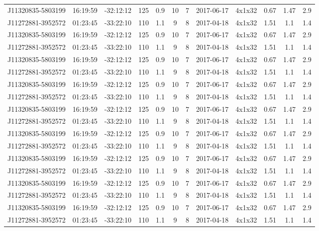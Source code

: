 \documentclass[onecolumn]{aa} %
\begin{document}
{\begin{landscape}
\begin{longtable}{cccccccccccc}
J11320835-5803199 & 16:19:59 & -32:12:12 & 125 & 0.9 & 10 & 7 & 2017-06-17 & 4x1x32 & 0.67 & 1.47 & 2.9 \\
J11272881-3952572 & 01:23:45 & -33:22:10 & 110 & 1.1 & 9 & 8 & 2017-04-18 & 4x1x32 & 1.51 & 1.1 & 1.4 \\
J11320835-5803199 & 16:19:59 & -32:12:12 & 125 & 0.9 & 10 & 7 & 2017-06-17 & 4x1x32 & 0.67 & 1.47 & 2.9 \\
J11272881-3952572 & 01:23:45 & -33:22:10 & 110 & 1.1 & 9 & 8 & 2017-04-18 & 4x1x32 & 1.51 & 1.1 & 1.4 \\
J11320835-5803199 & 16:19:59 & -32:12:12 & 125 & 0.9 & 10 & 7 & 2017-06-17 & 4x1x32 & 0.67 & 1.47 & 2.9 \\
J11272881-3952572 & 01:23:45 & -33:22:10 & 110 & 1.1 & 9 & 8 & 2017-04-18 & 4x1x32 & 1.51 & 1.1 & 1.4 \\
J11320835-5803199 & 16:19:59 & -32:12:12 & 125 & 0.9 & 10 & 7 & 2017-06-17 & 4x1x32 & 0.67 & 1.47 & 2.9 \\
J11272881-3952572 & 01:23:45 & -33:22:10 & 110 & 1.1 & 9 & 8 & 2017-04-18 & 4x1x32 & 1.51 & 1.1 & 1.4 \\
J11320835-5803199 & 16:19:59 & -32:12:12 & 125 & 0.9 & 10 & 7 & 2017-06-17 & 4x1x32 & 0.67 & 1.47 & 2.9 \\
J11272881-3952572 & 01:23:45 & -33:22:10 & 110 & 1.1 & 9 & 8 & 2017-04-18 & 4x1x32 & 1.51 & 1.1 & 1.4 \\
J11320835-5803199 & 16:19:59 & -32:12:12 & 125 & 0.9 & 10 & 7 & 2017-06-17 & 4x1x32 & 0.67 & 1.47 & 2.9 \\
J11272881-3952572 & 01:23:45 & -33:22:10 & 110 & 1.1 & 9 & 8 & 2017-04-18 & 4x1x32 & 1.51 & 1.1 & 1.4 \\
J11320835-5803199 & 16:19:59 & -32:12:12 & 125 & 0.9 & 10 & 7 & 2017-06-17 & 4x1x32 & 0.67 & 1.47 & 2.9 \\
J11272881-3952572 & 01:23:45 & -33:22:10 & 110 & 1.1 & 9 & 8 & 2017-04-18 & 4x1x32 & 1.51 & 1.1 & 1.4 \\
J11320835-5803199 & 16:19:59 & -32:12:12 & 125 & 0.9 & 10 & 7 & 2017-06-17 & 4x1x32 & 0.67 & 1.47 & 2.9 \\
J11272881-3952572 & 01:23:45 & -33:22:10 & 110 & 1.1 & 9 & 8 & 2017-04-18 & 4x1x32 & 1.51 & 1.1 & 1.4 \\
J11320835-5803199 & 16:19:59 & -32:12:12 & 125 & 0.9 & 10 & 7 & 2017-06-17 & 4x1x32 & 0.67 & 1.47 & 2.9 \\
J11272881-3952572 & 01:23:45 & -33:22:10 & 110 & 1.1 & 9 & 8 & 2017-04-18 & 4x1x32 & 1.51 & 1.1 & 1.4 \\

\end{longtable}
\end{landscape}}
\end{document}
